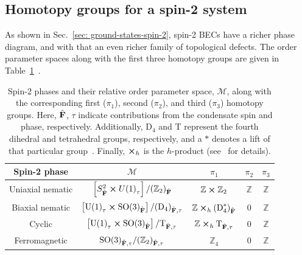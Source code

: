 \subsection{Homotopy groups for a spin-2 system}
As shown in Sec.~\ref{sec: ground-states-spin-2}, spin-2 BECs have a richer
phase diagram, and with that an even richer family of topological defects.
The order parameter spaces along with the first three homotopy groups are
given in Table~\ref{tab: spin-2-homotopy-groups}~\cite{Mermin1979,Kawaguchi2012,
Kobayashi2012}.
\begin{table}
    \centering
    \begin{tabular}{ccccc}
        \toprule
        Spin-2 phase & \(\mathcal{M}\) & \(\pi_1\) & \(\pi_2\) & \(\pi_3\) \\
        \midrule
        Uniaxial nematic & \(\left[S^2_{\hat{\vb{F}}} \cross {U(1)}_\tau\right]
        / {({\mathbb{Z}}_2)}_{\hat{\vb{F}}} \)
        & \(\mathbb{Z} \cross \mathbb{Z}_2\)
        & \(\mathbb{Z}\) & \(\mathbb{Z} \) \\
        Biaxial nematic & \(\left[{\text{U}(1)}_\tau \cross
        {\text{SO}(3)}_{\hat{\vb{F}}}\right]
        / {(\text{D}_4)}_{\hat{\vb{F}}, \tau}\)
        & \(\mathbb{Z} \cross_h {(\text{D}^\ast_4)}_{\hat{\vb{F}}}\) & 0
        & \(\mathbb{Z}\) \\
        Cyclic & \(\left[{\text{U}(1)}_\tau
        \cross {\text{SO}(3)}_{\hat{\vb{F}}}\right]
        / \text{T}_{\hat{\vb{F}}, \tau}\)
        & \(\mathbb{Z} \cross_h \text{T}_{\hat{\vb{F}}, \tau}\) & 0
        & \(\mathbb{Z}\) \\
        Ferromagnetic & \({\text{SO}(3)}_{\hat{\vb{F}}, \tau}
        / {({\mathbb{Z}}_2)}_{\hat{\vb{F}}, \tau}\)
        & \({\mathbb{Z}}_4\) & 0 & \(\mathbb{Z}\) \\
        \bottomrule
    \end{tabular}
    \caption[Order parameter spaces and first three homotopy groups for spin-2
    BECs]{\label{tab: spin-2-homotopy-groups}Spin-2 phases and their relative
    order parameter space, \(\mathcal{M}\), along with the corresponding first
    (\(\pi_1\)), second (\(\pi_2\)), and third (\(\pi_3\)) homotopy groups.
    Here, \(\hat{\vb{F}}\), \(\tau \) indicate contributions from the
    condensate spin and phase, respectively.
    Additionally, \(\text{D}_4\) and T represent the fourth dihedral and
    tetrahedral groups, respectively, and a \(\ast \) denotes a lift of that
    particular group~\cite{Mermin1979}.
    Finally, \(\cross_h\) is the \(h\)-product (see~\cite{Kobayashi2012} for
    details).}
\end{table}

